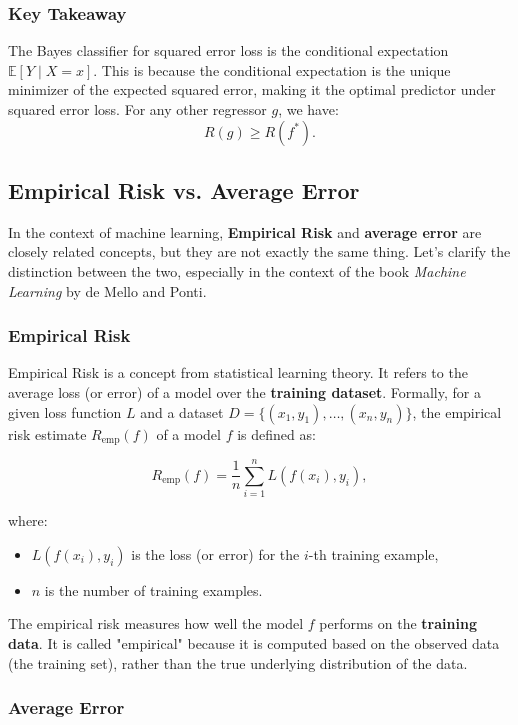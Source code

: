 \begin{notechapter}
\subsubsection{Key Takeaway}
The Bayes classifier for squared error loss is the conditional expectation \( \mathbb{E}[Y \mid X = x] \). This is because the conditional expectation is the unique minimizer of the expected squared error, making it the optimal predictor under squared error loss. For any other regressor \( g \), we have:
\[
R(g) \geq R(f^*).
\]

\subsection{Empirical Risk vs. Average Error}

In the context of machine learning, \textbf{Empirical Risk} and \textbf{average error} are closely related concepts, but they are not exactly the same thing. Let's clarify the distinction between the two, especially in the context of the book \textit{Machine Learning} by de Mello and Ponti.

\subsubsection{Empirical Risk}

Empirical Risk is a concept from statistical learning theory. It refers to the average loss (or error) of a model over the \textbf{training dataset}. Formally, for a given loss function \( L \) and a dataset \( D = \{(x_1, y_1), \dots, (x_n, y_n)\} \), the empirical risk estimate \( R_{\text{emp}}(f) \) of a model \( f \) is defined as:

\[
R_{\text{emp}}(f) = \frac{1}{n} \sum_{i=1}^n L(f(x_i), y_i),
\]

where:
\begin{itemize}
    \item \( L(f(x_i), y_i) \) is the loss (or error) for the \( i \)-th training example,
    \item \( n \) is the number of training examples.
\end{itemize}

The empirical risk measures how well the model \( f \) performs on the \textbf{training data}. It is called "empirical" because it is computed based on the observed data (the training set), rather than the true underlying distribution of the data.

\subsubsection{Average Error}


\end{notechapter}
